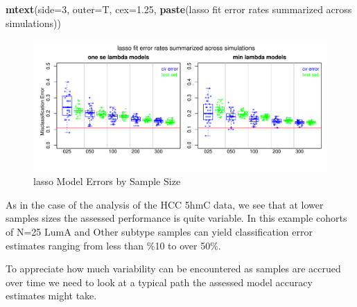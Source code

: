 \documentclass[
]{book}
\newenvironment{Shaded}{\begin{snugshade}}{\end{snugshade}}
\newcommand{\DataTypeTok}[1]{\textcolor[rgb]{0.13,0.29,0.53}{#1}}
\newcommand{\DecValTok}[1]{\textcolor[rgb]{0.00,0.00,0.81}{#1}}
\newcommand{\FloatTok}[1]{\textcolor[rgb]{0.00,0.00,0.81}{#1}}
\newcommand{\KeywordTok}[1]{\textcolor[rgb]{0.13,0.29,0.53}{\textbf{#1}}}
\newcommand{\NormalTok}[1]{#1}
\newcommand{\StringTok}[1]{\textcolor[rgb]{0.31,0.60,0.02}{#1}}
\begin{document}
\begin{Shaded}
\begin{Highlighting}[]
\KeywordTok{mtext}\NormalTok{(}\DataTypeTok{side=}\DecValTok{3}\NormalTok{, }\DataTypeTok{outer=}\NormalTok{T, }\DataTypeTok{cex=}\FloatTok{1.25}\NormalTok{, }\KeywordTok{paste}\NormalTok{(}\StringTok{\textquotesingle{}lasso fit error rates summarized across simulations\textquotesingle{}}\NormalTok{))}
\end{Highlighting}
\end{Shaded}

\begin{figure}
\centering
\includegraphics{Static/figures/brca-rnaseq-lasso-simRes-errors-overSim-1.pdf}
\caption{\label{fig:brca-rnaseq-lasso-simRes-errors-overSim}lasso Model Errors by Sample Size}
\end{figure}

As in the case of the analysis of the HCC 5hmC data, we see that at lower
samples sizes the assessed performance is quite variable.
In this example cohorts of N=25 LumA and Other subtype samples
can yield classification error estimates ranging from less than \%10
to over 50\%.

To appreciate how much variability can be encountered as samples are accrued over time
we need to look at a typical path the assessed model accuracy estimates might take.
\end{document}
